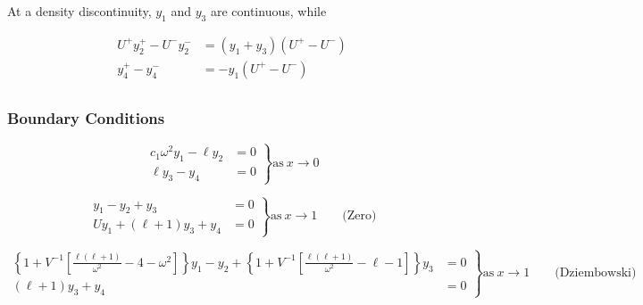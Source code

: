 \documentclass[fleqn]{article}
\begin{document}
At a density discontinuity, $y_{1}$ and $y_{3}$ are continuous, while

\begin{align*}
U^{+} y_{2}^{+} - U^{-} y_{2}^{-} &= (y_{1} + y_{3}) (U^{+} - U^{-}) \\
y_{4}^{+} - y_{4}^{-} &= -y_{1} (U^{+} - U^{-}) \\
\end{align*}

\subsubsection*{Boundary Conditions}

\begin{equation*}
\left.
\begin{aligned}
c_{1} \omega^{2} y_{1} - \ell y_{2} &= 0 \\
\ell y_{3} - y_{4} &= 0
\end{aligned}
\right\}
\text{as}\ x \rightarrow 0
\end{equation*}

\begin{equation*}
\left.
\begin{aligned}
y_{1} - y_{2} + y_{3} &= 0 \\
U y_{1} + (\ell + 1) y_{3} + y_{4} &= 0
\end{aligned}
\right\}
\text{as}\ x \rightarrow 1 \qquad \text{(Zero)}
\end{equation*}

\begin{equation*}
\left.
\begin{aligned}
\left\{ 1 + V^{-1} \left[ \frac{\ell(\ell+1)}{\omega^{2}} - 4 - \omega^{2} \right] \right\} y_{1} -
y_{2} +
\left\{ 1 + V^{-1} \left[ \frac{\ell(\ell+1)}{\omega^{2}} - \ell - 1 \right] \right\} y_{3} &= 0 \\
(\ell + 1) y_{3} + y_{4} &= 0
\end{aligned}
\right\} 
\text{as}\ x \rightarrow 1 \qquad \text{(Dziembowski)}
\end{equation*}




\end{document}
